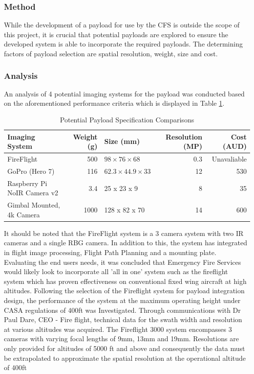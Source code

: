 \subsubsection{Method}
While the development of a payload for use by the CFS is outside the scope of this project, it is crucial that potential payloads are explored to ensure the developed system is able to incorporate the required payloads. The determining factors of payload selection are spatial resolution, weight, size and cost. 

\subsubsection{Analysis}
An analysis of 4 potential imaging systems for the payload was conducted based on the aforementioned performance criteria which is displayed in Table \ref{tab:Payloads}. 

\begin{table}[H]
\caption{Potential Payload Specification Comparisons}
\label{tab:Payloads}
\begin{tabular}{|p{3.5cm}|r|p{2.0cm}|r|r|} \hline
Imaging System  & Weight (g) & Size (mm)  & Resolution (MP) & Cost (AUD)  \\ \hline
FireFlight  & 500  & $98 \times 76 \times 68 $ & 0.3      & Unavaliable \\ \hline
GoPro (Hero 7)     & 116  & $62.3 \times 44.9 \times 33$    & 12       & 530         \\ \hline
Raspberry Pi NoIR Camera  v2 & 3.4  & \cellcolor[HTML]{FFFFFF}25 x 23 x 9   & 8     & 35   \\ \hline
Gimbal Mounted, 4k Camera    & 1000 & \cellcolor[HTML]{FFFFFF}128 x 82 x 70 & 14   & 600  \\  \hline    
\end{tabular}
\end{table}

It should be noted that the FireFlight system is a 3 camera system with two IR cameras and a single RBG camera. In addition to this, the system has integrated in flight image processing, 
Flight Path Planning and a mounting plate. Evaluating the end users needs, it was concluded that Emergency Fire Services would likely look to incorporate all 'all in one' system such as the fireflight system which has proven effectiveness on conventional fixed wing aircraft at high altitudes. Following the selection of the Fireflight system for payload integration design, the performance of the system at the maximum operating height under CASA regulations of 400ft was Investigated. Through communications with Dr Paul Dare, CEO - Fire flight, technical data for the swath width and resolution at various altitudes was acquired. The Fireflight 3000 system encompasses 3 cameras with varying focal lengths of 9mm, 13mm and 19mm. Resolutions are only provided for altitudes of 5000 ft and above and consequently the data must be extrapolated to approximate the spatial resolution at the operational altitude of 400ft\\

